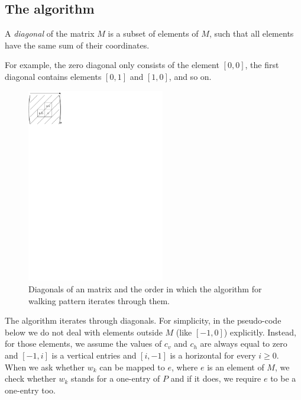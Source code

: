 \subsection{The algorithm}
\begin{defn}
A \emph{diagonal} of the matrix $M$ is a subset of elements of $M$, such that all elements have the same sum of their coordinates.
\end{defn}
For example, the zero diagonal only consists of the element $[0,0]$, the first diagonal contains elements $[0,1]$ and $[1,0]$, and so on.
\begin{figure}[h!]
\centering
\includegraphics[width=60mm]{../img/walking_alg.pdf}
\caption{Diagonals of an matrix and the order in which the algorithm for walking pattern iterates through them.}
\end{figure}

The algorithm iterates through diagonals. For simplicity, in the pseudo-code below we do not deal with elements outside $M$ (like $[-1,0]$) explicitly. Instead, for those elements, we assume the values of $c_v$ and $c_h$ are always equal to zero and $[-1,i]$ is a vertical entries and $[i,-1]$ is a horizontal for every $i\geq0$. When we ask whether $w_k$ can be mapped to $e$, where $e$ is an element of $M$, we check whether $w_k$ stands for a one-entry of $P$ and if it does, we require $e$ to be a one-entry too.

